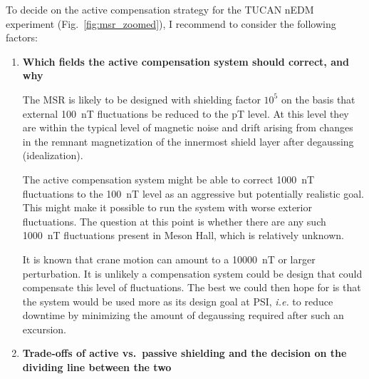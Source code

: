 To decide on the active compensation strategy for the TUCAN nEDM experiment (Fig.~\ref{fig:msr_zoomed}), I recommend to consider the following factors:
\begin{enumerate}

    \item {\bf Which fields the active compensation system should correct, and why}

    The MSR is likely to be designed with shielding factor $10^5$ on the basis that external 100~nT fluctuations be reduced to the pT level.  At this level they are within the typical level of magnetic noise and drift arising from changes in the remnant magnetization of the innermost shield layer after degaussing (idealization).

    The active compensation system might be able to correct 1000~nT fluctuations to the 100~nT level as an aggressive but potentially realistic goal. This might make it possible to run the system with worse exterior fluctuations. The question at this point is whether there are any such 1000~nT fluctuations present in Meson Hall, which is relatively unknown.
    
    It is known that crane motion can amount to a 10000~nT or larger perturbation. It is unlikely a compensation system could be design that could compensate this level of fluctuations. The best we could then hope for is that the system would be used more as its design goal at PSI, {\it i.e.} to reduce downtime by minimizing the amount of degaussing required after such an excursion.

    \item {\bf Trade-offs of active vs.~passive shielding and the decision on the dividing line between the two} 
    
    
    
    


\end{enumerate}
